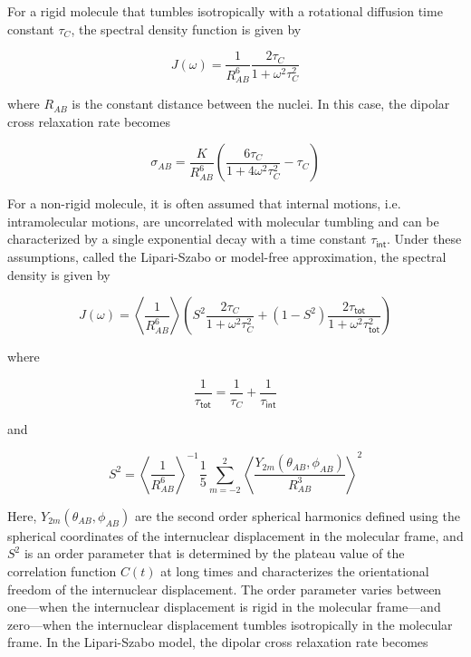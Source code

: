 \documentclass[9pt,review]{livecoms}
\begin{document}
For a rigid molecule that tumbles isotropically with a rotational diffusion time constant $\tau_C$, the spectral density function is given by

\begin{equation}
\label{eqn:noe_rigid_spectral_density}
J(\omega) = \frac {1} {R_{AB}^6} \frac {2 \tau_C} {1 + \omega^2 \tau_C^2}
\end{equation}

\noindent where $R_{AB}$ is the constant distance between the nuclei. In this case, the dipolar cross relaxation rate becomes

\begin{equation}
\label{eqn:noe_rigid_cross_relaxation}
\sigma_{AB} = \frac {K} {R_{AB}^6} \left( \frac {6 \tau_C} {1 + 4 \omega^2 \tau_C^2} - \tau_C \right)
\end{equation}

For a non-rigid molecule, it is often assumed that internal motions, i.e. intramolecular motions, are uncorrelated with molecular tumbling and can be characterized by a single exponential decay with a time constant $\tau_{\mathsf{int}}$.
Under these assumptions, called the Lipari-Szabo or model-free approximation, the spectral density is given by

\begin{equation}
\label{eqn:ls_spectral_density}
J(\omega) = \left \langle \frac {1} {R_{AB}^6} \right \rangle \left( S^2 \frac {2 \tau_C} {1 + \omega^2 \tau_C^2} + \left( 1 - S^2 \right) \frac {2 \tau_{\mathsf{tot}}} {1 + \omega^2 \tau_{\mathsf{tot}}^2} \right)
\end{equation}

\noindent where

\begin{equation}
\label{eqn:ls_total_tumbling}
\frac {1} {\tau_{\mathsf{tot}}} = \frac {1} {\tau_C} + \frac {1} {\tau_{\mathsf{int}}}
\end{equation}

\noindent and

\begin{equation}
\label{eqn:ls_order_parameter}
S^2 = \left \langle \frac {1} {R_{AB}^6} \right \rangle^{-1} \frac {1} {5} \sum_{m=-2}^2 \left \langle \frac {Y_{2m}(\theta_{AB}, \phi_{AB})} {R_{AB}^3} \right \rangle^2
\end{equation}

\noindent Here, $Y_{2m}(\theta_{AB}, \phi_{AB})$ are the second order spherical harmonics defined using the spherical coordinates of the internuclear displacement in the molecular frame, and $S^2$ is an order parameter that is determined by the plateau value of the correlation function $C(t)$ at long times and characterizes the orientational freedom of the internuclear displacement.
The order parameter varies between one---when the internuclear displacement is rigid in the molecular frame---and zero---when the internuclear displacement tumbles isotropically in the molecular frame.
In the Lipari-Szabo model, the dipolar cross relaxation rate becomes
\end{document}
